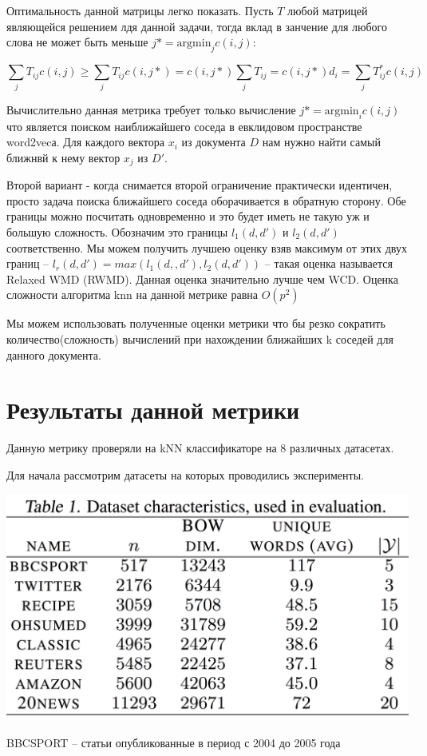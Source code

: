 \documentclass[10pt,reqno]{amsart}
\theoremstyle{definition}
\theoremstyle{remark}
\begin{document}
Оптимальность данной матрицы легко показать. Пусть $T$ любой матрицей являющейся решением лдя данной задачи, тогда вклад в занчение для любого слова не может быть меньше $j* = \text{argmin}_j c(i,j)$:

$$
\sum_{j} T_{ij} c(i,j) \geq \sum_{j} T_{ij} c(i,j*)  =   c(i,j*) \sum_{j} T_{ij} = c(i,j*) d_i = \sum_{j} T^*_{ij} c(i,j)
$$

Вычислительно данная метрика требует только вычисление $j* = \text{argmin}_i c(i,j)$ что является поиском наиближайшего соседа в евклидовом пространстве word2vecа. Для каждого вектора $x_i$ из документа $D$  нам нужно найти самый ближнвй к нему вектор $x_j$ из $D'$.

Второй вариант - когда снимается второй ограничение практически идентичен, просто задача поиска ближайшего соседа оборачивается в обратную сторону. Обе границы можно посчитать одновременно и это будет иметь не такую уж и большую сложность. Обозначим это границы $l_1(d, d')$ и $l_2(d, d')$ соответственно. Мы можем получить лучшею оценку взяв максимум от этих двух границ -- $l_r(d, d') = max(l_1(d, ,d'), l_2(d, d'))$ -- такая оценка называется Relaxed WMD (RWMD). Данная оценка значительно лучше чем WCD. Оценка сложности алгоритма knn на данной метрике равна $O(p^2)$

Мы можем использовать полученные оценки метрики что бы резко сократить количество(сложность) вычислений при нахождении ближайших k соседей для данного документа.

\section{Результаты данной метрики}

Данную метрику проверяли на kNN классификаторе на 8 различных датасетах.

Для начала рассмотрим датасеты на которых проводились эксперименты.

\includegraphics[width=0.6 \textwidth]{2.png}

BBCSPORT -- статьи опубликованные в период с 2004 до 2005 года
\end{document}
